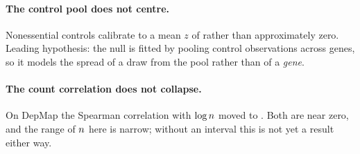\paragraph{The control pool does not centre.} Nonessential controls calibrate to a mean $z$ of
\DepmapNonessentialMeanZ{} rather than approximately zero. Leading hypothesis: the null is
fitted by pooling control observations across genes, so it models the spread of a draw from
the pool rather than of a \emph{gene}.

\paragraph{The count correlation does not collapse.} On DepMap the Spearman correlation with
$\log n$ moved \DepmapCountSpearmanRaw{} to \DepmapCountSpearmanCalibrated{}. Both are
near zero, and the range of $n$ here is narrow; without an interval this is not yet a
result either way.\Pending{}

